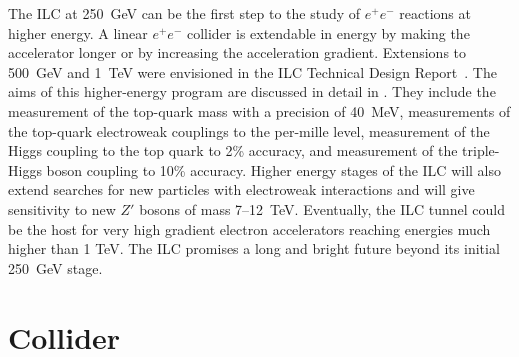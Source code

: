 \documentclass[%
reprint,
 floatfix,
 amsmath,amssymb,
 aps,
]{revtex4-1}
\newcommand{\todo}[1]{\textcolor{red}{{#1}}}
\def\ee{e^+e^-}
\begin{document}
The ILC at 250~GeV can be the first step to the study of $\ee$
reactions at higher energy.   A linear $\ee$ collider is extendable in
energy by making the accelerator longer or by increasing the
acceleration gradient. Extensions to 500~GeV and 1~TeV were envisioned
in the ILC Technical Design Report~\cite{Behnke:2013xla}.   The aims
of 
this higher-energy program are discussed in detail in
\cite{ILCforESS}.
They include the
measurement of the top-quark mass with a precision of 40~MeV, 
measurements of the top-quark
electroweak couplings to the per-mille level, measurement of the
Higgs coupling to the top quark to 2\% accuracy, and measurement of
the triple-Higgs boson coupling to 10\%  accuracy.   Higher energy stages of the ILC will also extend searches for new particles with electroweak interactions and will give sensitivity to new $Z'$ bosons of mass 7--12~TeV. 
Eventually, the ILC tunnel could be the host for  very high
gradient electron accelerators reaching energies much higher than 1 TeV.   The 
ILC promises a long and bright future beyond its initial 250~GeV stage.



\vspace{-.4cm}

\section{\label{sec:collider}Collider}

\vspace{-.3cm}

\end{document}
